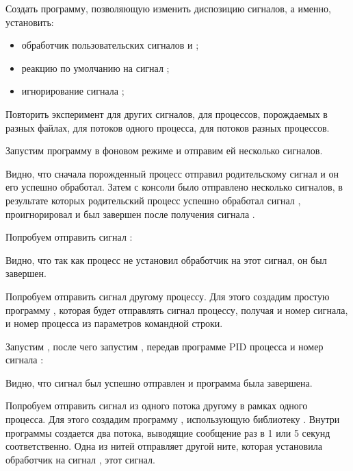 Создать программу, позволяющую изменить диспозицию сигналов, а именно, установить:

\begin{itemize}
	\item обработчик пользовательских сигналов  и ;
	\item реакцию по умолчанию на сигнал ;
	\item игнорирование сигнала ;
\end{itemize}

Повторить эксперимент для других сигналов, для процессов, порождаемых в разных файлах, для потоков одного процесса, для потоков разных процессов.


Запустим программу  в фоновом режиме и отправим ей несколько сигналов.


Видно, что сначала порожденный процесс отправил родительскому сигнал  и он его успешно обработал. Затем с консоли было отправлено несколько сигналов, в результате которых родительский процесс успешно обработал сигнал , проигнорировал  и был завершен после получения сигнала .

Попробуем отправить сигнал :


Видно, что так как процесс не установил обработчик на этот сигнал, он был завершен.

Попробуем отправить сигнал другому процессу. Для этого создадим простую программу , которая будет отправлять сигнал процессу, получая и номер сигнала, и номер процесса из параметров командной строки.


Запустим , после чего запустим , передав программе PID процесса  и номер сигнала :


Видно, что сигнал был успешно отправлен и программа  была завершена.

Попробуем отправить сигнал из одного потока другому в рамках одного процесса. Для этого создадим программу , использующую библиотеку . Внутри программы создается два потока, выводящие сообщение раз в 1 или 5 секунд соответственно. Одна из нитей отправляет другой ните, которая установила обработчик на сигнал , этот сигнал.

